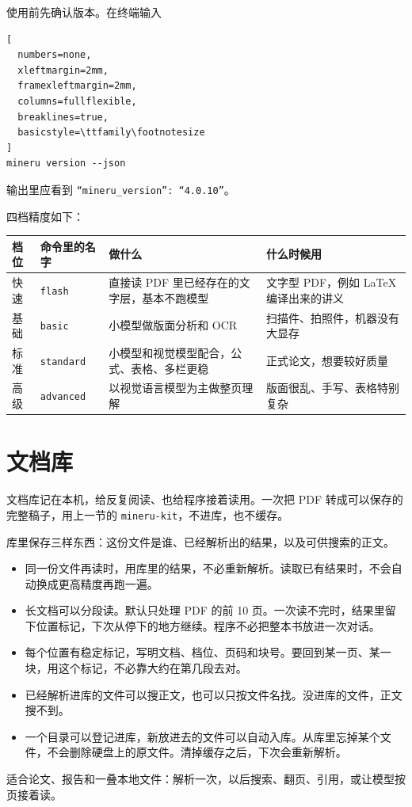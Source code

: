 使用前先确认版本。在终端输入
\begin{lstlisting}[
  numbers=none,
  xleftmargin=2mm,
  framexleftmargin=2mm,
  columns=fullflexible,
  breaklines=true,
  basicstyle=\ttfamily\footnotesize
]
mineru version --json
\end{lstlisting}
输出里应看到 \verb|“mineru_version”: “4.0.10”|。

四档精度如下：

\begin{center}
\begin{tabular}{|p{}|p{}|p{}|p{}|}
\hline
\centering\arraybackslash 档位 &
\centering\arraybackslash 命令里的名字 &
\centering\arraybackslash 做什么 &
\centering\arraybackslash 什么时候用 \\
\hline
快速 & \texttt{flash} & 直接读 PDF 里已经存在的文字层，基本不跑模型 & 文字型 PDF，例如 LaTeX 编译出来的讲义 \\
\hline
基础 & \texttt{basic} & 小模型做版面分析和 OCR & 扫描件、拍照件，机器没有大显存 \\
\hline
标准 & \texttt{standard} & 小模型和视觉模型配合，公式、表格、多栏更稳 & 正式论文，想要较好质量 \\
\hline
高级 & \texttt{advanced} & 以视觉语言模型为主做整页理解 & 版面很乱、手写、表格特别复杂 \\
\hline
\end{tabular}
\end{center}

\section{文档库}
文档库记在本机，给反复阅读、也给程序接着读用。一次把 PDF 转成可以保存的完整稿子，用上一节的 \verb|mineru-kit|，不进库，也不缓存。

库里保存三样东西：这份文件是谁、已经解析出的结果，以及可供搜索的正文。

\begin{itemize}
\item 同一份文件再读时，用库里的结果，不必重新解析。读取已有结果时，不会自动换成更高精度再跑一遍。
\item 长文档可以分段读。默认只处理 PDF 的前 10 页。一次读不完时，结果里留下位置标记，下次从停下的地方继续。程序不必把整本书放进一次对话。
\item 每个位置有稳定标记，写明文档、档位、页码和块号。要回到某一页、某一块，用这个标记，不必靠大约在第几段去对。
\item 已经解析进库的文件可以搜正文，也可以只按文件名找。没进库的文件，正文搜不到。
\item 一个目录可以登记进库，新放进去的文件可以自动入库。从库里忘掉某个文件，不会删除硬盘上的原文件。清掉缓存之后，下次会重新解析。
\end{itemize}

适合论文、报告和一叠本地文件：解析一次，以后搜索、翻页、引用，或让模型按页接着读。
